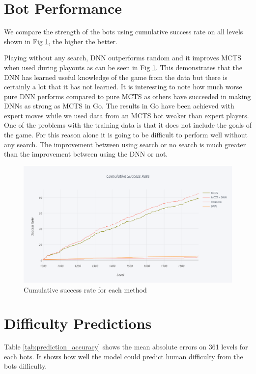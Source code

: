 \documentclass{kththesis}
\begin{document}
\section{Bot Performance}
We compare the strength of the bots using cumulative success rate on all levels shown in Fig \ref{fig:cumulative_sr}, the higher the better.

Playing without any search, DNN outperforms random and it improves MCTS when used during playouts as can be seen in Fig \ref{fig:cumulative_sr}. This demonstrates  that the DNN has learned useful knowledge of the game from the data but there is certainly a lot that it has not learned. It is interesting to note how much worse pure DNN performs compared to pure MCTS as others have succeeded in making DNNs as strong as MCTS in Go. The results in Go have been achieved with expert moves while we used data from an MCTS bot weaker than expert players. One of the problems with the training data is that it does not include the goals of the game. For this reason alone it is going to be difficult to perform well without any search. The improvement between using search or no search is much greater than the improvement between using the DNN or not.

\begin{figure}[!htb]
\centering
\includegraphics[width=\textwidth]{images/cumulative_sr.png}
\caption{Cumulative success rate for each method}
\label{fig:cumulative_sr}
\end{figure}


\section{Difficulty Predictions}
Table \ref{tab:prediction_accuracy} shows the mean absolute errors on 361 levels for each bots. It shows how well the model could predict human difficulty from the bots difficulty. 
\end{document}
